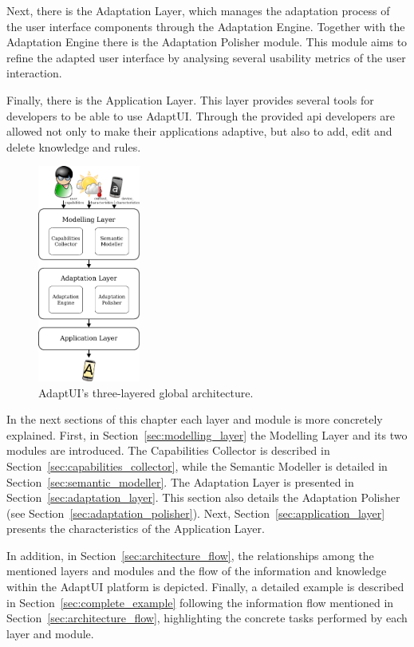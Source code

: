 Next, there is the Adaptation Layer, which manages the adaptation process of the
user interface components through the Adaptation Engine. Together with the
Adaptation Engine there is the Adaptation Polisher module. This module aims to
refine the adapted user interface by analysing several usability metrics of the
user interaction.

Finally, there is the Application Layer. This layer provides several tools for
developers to be able to use AdaptUI. Through the provided \ac{api} developers 
are allowed not only to make their applications adaptive, but also to add, edit 
and delete knowledge and rules.

\begin{figure}[H]
\centering
\includegraphics[width=0.30\textwidth]{architecture.pdf}
\caption{AdaptUI's three-layered global architecture.}
\label{fig:architecture}
\end{figure}

In the next sections of this chapter each layer and module is more concretely
explained. First, in Section~\ref{sec:modelling_layer} the Modelling Layer and
its two modules are introduced. The Capabilities Collector is described in
Section~\ref{sec:capabilities_collector}, while the Semantic Modeller is 
detailed in Section~\ref{sec:semantic_modeller}. The Adaptation Layer is 
presented in Section~\ref{sec:adaptation_layer}. This section also details the 
Adaptation Polisher (see Section~\ref{sec:adaptation_polisher}). Next,
Section~\ref{sec:application_layer} presents the characteristics of the 
Application Layer.

In addition, in Section~\ref{sec:architecture_flow}, the relationships among 
the mentioned layers and modules and the flow of the information and knowledge 
within the AdaptUI platform is depicted. Finally, a detailed example is
described in Section~\ref{sec:complete_example} following the information flow
mentioned in Section~\ref{sec:architecture_flow}, highlighting the concrete
tasks performed by each layer and module.






